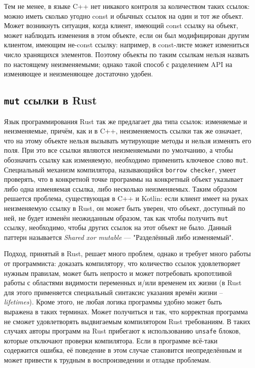 \documentclass[specification,annotation,times]{itmo-student-thesis}
\begin{document}
Тем не менее, в языке C++ нет никакого контроля за количеством таких ссылок: можно иметь сколько угодно const и обычных ссылок на один и тот же объект. Может возникнуть ситуация, когда клиент, имеющий const ссылку на объект, может наблюдать изменения в этом объекте, если он был модифицирован другим клиентом, имеющим не-const ссылку: например, в const-листе может измениться число хранящихся элементов.
Поэтому объекты по таким ссылкам нельзя назвать по настоящему неизменяемыми; однако такой способ с разделением API на изменяющее и неизменяющее достаточно удобен.

\subsection{\texttt{mut} ссылки в Rust}

Язык программирования Rust так же предлагает два типа ссылок: изменяемые и неизменяемые, причём, как и в C++, неизменяемость ссылки так же означает, что на этому объекте нельзя вызывать мутирующие методы и нельзя изменять его поля. При это все ссылки являются неизменяемыми по умолчанию, а чтобы обозначить ссылку как изменяемую, необходимо применить ключевое слово \texttt{mut}. 
Специальный механизм компилятора, называющийся \texttt{borrow checker}, умеет проверять, что в конкретной точке программы на конкретный объект указывает либо одна изменяемая ссылка, либо несколько неизменяемых.
Таким образом решается проблема, существующая в C++ и Kotlin: если клиент имеет на руках неизменяемую ссылку в Rust, он может быть уверен, что объект, доступный по ней, не будет изменён неожиданным образом, так как чтобы получить \texttt{mut} ссылку, необходимо, чтобы других ссылок на этот объект не было.
Данный паттерн называется \textit{Shared xor mutable} --- "Разделённый либо изменяемый".

Подход, принятый в Rust, решает много проблем, однако и требует много работы от программиста: доказать компилятору, что количество ссылок удовлетворяет нужным правилам, может быть непросто и может потребовать кропотливой работы с областями видимости переменных и/или временем их жизни (в Rust для этого применяется специальный синтаксис указания времён жизни -- \textit{lifetimes}).
Кроме этого, не любая логика программы удобно может быть выражена в таких терминах. Может получиться и так, что корректная программа не сможет удовлетворять выдвигаемым компилятором Rust требованиям.
В таких случаях авторы программ на Rust прибегают к использованию \texttt{unsafe} блоков, которые отключают проверки компилятора.
Если в программе всё-таки содержится ошибка, её поведение в этом случае становится неопределённым и может привести к трудным в воспроизведении и отладке проблемам.
\end{document}
